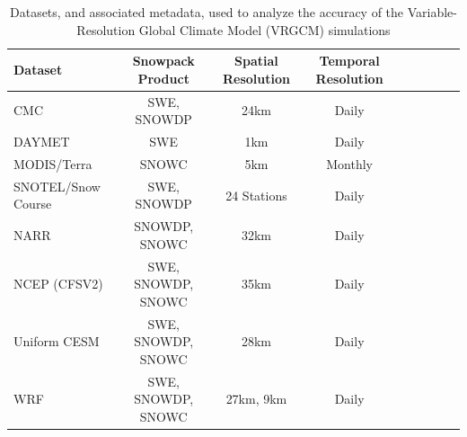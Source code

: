 \documentclass[11pt]{article}
\begin{document}
\begin{table}[t]
\caption{Datasets, and associated metadata, used to analyze the accuracy of the Variable-Resolution Global Climate Model (VRGCM) simulations}\label{t1}
\begin{center}
\begin{tabular*}{\textwidth}{@{\extracolsep\fill}lcccccccc}
\hline
Dataset & Snowpack  Product & Spatial  Resolution & Temporal Resolution \\
\hline
 CMC & SWE, SNOWDP & 24km & Daily\\
 DAYMET & SWE & 1km & Daily \\
 MODIS/Terra & SNOWC & 5km & Monthly \\
 SNOTEL/Snow Course & SWE, SNOWDP & 24 Stations & Daily \\
 NARR & SNOWDP, SNOWC & 32km & Daily \\
 NCEP (CFSV2) & SWE, SNOWDP, SNOWC & 35km & Daily \\
\hline
 Uniform CESM & SWE, SNOWDP, SNOWC & 28km & Daily \\
 WRF & SWE, SNOWDP, SNOWC & 27km, 9km & Daily \\
\hline
\end{tabular*}
\end{center}
\end{table}
\end{document}

